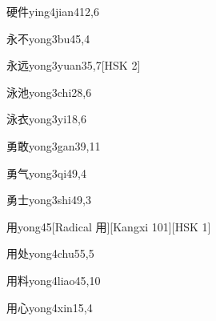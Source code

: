 \begin{entry}{硬件}{ying4jian4}{12,6}
\end{entry}

\begin{entry}{永不}{yong3bu4}{5,4}
\end{entry}

\begin{entry}{永远}{yong3yuan3}{5,7}[HSK 2]
\end{entry}

\begin{entry}{泳池}{yong3chi2}{8,6}
\end{entry}

\begin{entry}{泳衣}{yong3yi1}{8,6}
\end{entry}

\begin{entry}{勇敢}{yong3gan3}{9,11}
\end{entry}

\begin{entry}{勇气}{yong3qi4}{9,4}
\end{entry}

\begin{entry}{勇士}{yong3shi4}{9,3}
\end{entry}

\begin{entry}{用}{yong4}{5}[Radical 用][Kangxi 101][HSK 1]
\end{entry}

\begin{entry}{用处}{yong4chu5}{5,5}
\end{entry}

\begin{entry}{用料}{yong4liao4}{5,10}
\end{entry}

\begin{entry}{用心}{yong4xin1}{5,4}
\end{entry}

